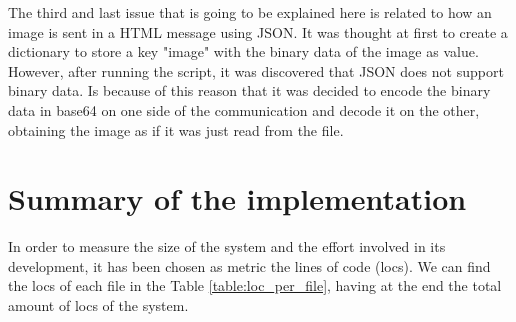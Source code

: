 The third and last issue that is going to be explained here is related to how an image is sent in a HTML message using JSON. It was thought at first to create a dictionary to store a key "image" with the binary data of the image as value. However, after running the script, it was discovered that JSON does not support binary data. Is because of this reason that it was decided to encode the binary data in \gls{base64} on one side of the communication and decode it on the other, obtaining the image as if it was just read from the file.

\section{Summary of the implementation}
In order to measure the size of the system and the effort involved in its development, it has been chosen as metric the lines of code (\glspl{loc}). We can find the \glspl{loc} of each file in the Table \ref{table:loc_per_file}, having at the end the total amount of \glspl{loc} of the system.

